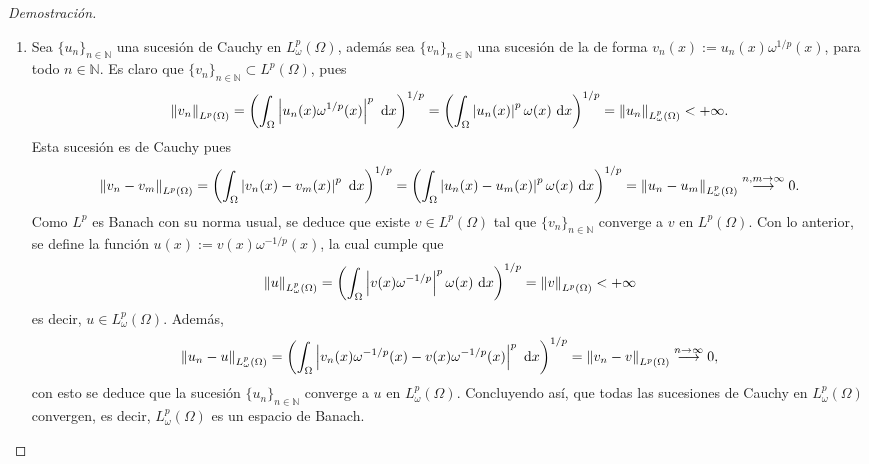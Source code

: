 \documentclass[10pt,a4paper]{report}
\newcommand{\abs}[2][y]{\if#1y\left\fi\lvert#2\if#1y\right\fi\rvert}
\newcommand{\norm}[2][y]{{\if#1y\left\fi\lVert#2\if#1y\right\fi\rVert}}
\theoremstyle{definition}
\renewcommand{\theproblem}{\Alph{problem}}
\numberwithin{equation}{problem}
\providecommand{\abs}[1]{\left\lvert#1\right\rvert}
\providecommand{\norm}[1]{\left\lVert#1\right\rVert}
\begin{document}
    \begin{proof}[\textcolor{rojo}{Demostración}]
    	\begin{enumerate}[label=\textbf{\theproblem.\arabic{*}.},ref=\theproblem.\arabic{*},parsep=1ex]
    		\item Sea $\{u_{n}\}_{n\in\mathbb{N}}$ una sucesión de Cauchy en $L^{p}_{\omega}(\Omega)$, además sea $\{v_{n}\}_{n\in\mathbb{N}}$ una sucesión de la de forma $v_{n}(x) := u_{n}(x)\omega^{1/p}(x)$, para todo $n\in\mathbb{N}$. Es claro que $\{v_{n}\}_{n\in\mathbb{N}}\subset L^{p}(\Omega)$, pues
    		\begin{align*}
    			\norm{v_{n}}_{L^{p}(\Omega)} = \left(\int_{\Omega}\abs{u_{n}(x)\omega^{1/p}(x)}^{p}\ \text{d}x\right)^{1/p} = \left(\int_{\Omega}\abs{u_{n}(x)}^{p}\omega(x)\ \text{d}x\right)^{1/p} = \norm{u_{n}}_{L^{p}_{\omega}(\Omega)} < +\infty.
    		\end{align*} 
    	    Esta sucesión es de Cauchy pues
    	    \begin{align*}
    	    	\norm{v_{n} - v_{m}}_{L^{p}(\Omega)} = \left(\int_{\Omega}\abs{v_{n}(x)- v_{m}(x)}^{p}\ \text{d}x \right)^{1/p} = \left(\int_{\Omega}\abs{u_{n}(x)- u_{m}(x)}^{p}\omega(x)\ \text{d}x \right)^{1/p} = \norm{u_{n}-u_{m}}_{L^{p}_{\omega}(\Omega)}\overset{n,m\to\infty}{\longrightarrow} 0.
    	    \end{align*}
            Como $L^{p}$ es Banach con su norma usual, se deduce que existe $v\in L^{p}(\Omega)$ tal que $\{v_{n}\}_{n\in\mathbb{N}}$ converge a $v$ en $L^{p}(\Omega)$. Con lo anterior, se define la función $u(x) := v(x)\omega^{-1/p}(x)$, la cual cumple que 
            \begin{align*}
            	\norm{u}_{L^{p}_{\omega}(\Omega)} = \left(\int_{\Omega}\abs{v(x)\omega^{-1/p}}^{p}\omega(x)\ \text{d}x\right)^{1/p} = \norm{v}_{L^{p}(\Omega)} < +\infty
            \end{align*}
            es decir, $u\in L^{p}_{\omega}(\Omega)$. Además,
            \begin{align*}
            	\norm{u_{n}-u}_{L^{p}_{\omega}(\Omega)} = \left(\int_{\Omega}\abs{v_{n}(x)\omega^{-1/p}(x)-v(x)\omega^{-1/p}(x)}^{p}\ \text{d}x\right)^{1/p} = \norm{v_{n}-v}_{L^{p}(\Omega)}\overset{n\to\infty}{\longrightarrow} 0,
            \end{align*}
            con esto se deduce que la sucesión $\{u_{n}\}_{n\in\mathbb{N}}$ converge a $u$ en $L^{p}_{\omega}(\Omega)$. Concluyendo así, que todas las sucesiones de Cauchy en $L^{p}_{\omega}(\Omega)$ convergen, es decir, $L^{p}_{\omega}(\Omega)$ es un espacio de Banach.

\end{enumerate}
\end{proof}
\end{document}
